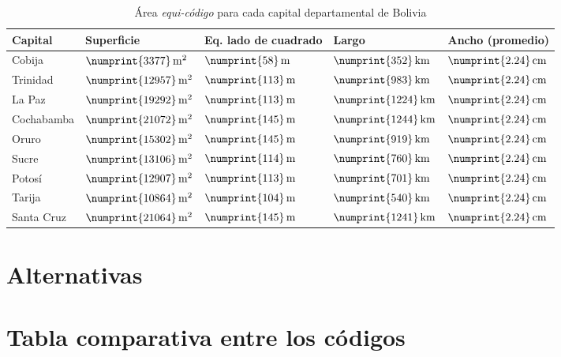 \documentclass[letterpaper]{article}
\begin{document}
\begin{table}
	\centering
	\begin{tabular}{|l|l|l|l|l|}
		\hline
		Capital & Superficie & Eq. lado de cuadrado & Largo & Ancho (promedio) \\
		\hline
		Cobija & \(\numprint{3377}\,\mathrm{m^{2}}\) & \(\numprint{58}\,\mathrm{m}\) & \(\numprint{352}\,\mathrm{km}\) & \(\numprint{2.24}\,\mathrm{cm}\) \\
		Trinidad & \(\numprint{12957}\,\mathrm{m^{2}}\) & \(\numprint{113}\,\mathrm{m}\) & \(\numprint{983}\,\mathrm{km}\) & \(\numprint{2.24}\,\mathrm{cm}\) \\
		La Paz & \(\numprint{19292}\,\mathrm{m^{2}}\) & \(\numprint{113}\,\mathrm{m}\) & \(\numprint{1224}\,\mathrm{km}\) & \(\numprint{2.24}\,\mathrm{cm}\) \\
		Cochabamba & \(\numprint{21072}\,\mathrm{m^{2}}\) & \(\numprint{145}\,\mathrm{m}\) & \(\numprint{1244}\,\mathrm{km}\) & \(\numprint{2.24}\,\mathrm{cm}\) \\
		Oruro & \(\numprint{15302}\,\mathrm{m^{2}}\) & \(\numprint{145}\,\mathrm{m}\) & \(\numprint{919}\,\mathrm{km}\) & \(\numprint{2.24}\,\mathrm{cm}\) \\
		Sucre & \(\numprint{13106}\,\mathrm{m^{2}}\) & \(\numprint{114}\,\mathrm{m}\) & \(\numprint{760}\,\mathrm{km}\) & \(\numprint{2.24}\,\mathrm{cm}\) \\
		Potosí & \(\numprint{12907}\,\mathrm{m^{2}}\) & \(\numprint{113}\,\mathrm{m}\) & \(\numprint{701}\,\mathrm{km}\) & \(\numprint{2.24}\,\mathrm{cm}\) \\
		Tarija & \(\numprint{10864}\,\mathrm{m^{2}}\) & \(\numprint{104}\,\mathrm{m}\) & \(\numprint{540}\,\mathrm{km}\) & \(\numprint{2.24}\,\mathrm{cm}\) \\
		Santa Cruz & \(\numprint{21064}\,\mathrm{m^{2}}\) & \(\numprint{145}\,\mathrm{m}\) & \(\numprint{1241}\,\mathrm{km}\) & \(\numprint{2.24}\,\mathrm{cm}\) \\
		\hline
	\end{tabular}
	\caption{Área \emph{equi-código} para cada capital departamental de Bolivia}
	\label{tab:capitales}
\end{table}

\section{Alternativas}

\section{Tabla comparativa entre los códigos}
\end{document}

